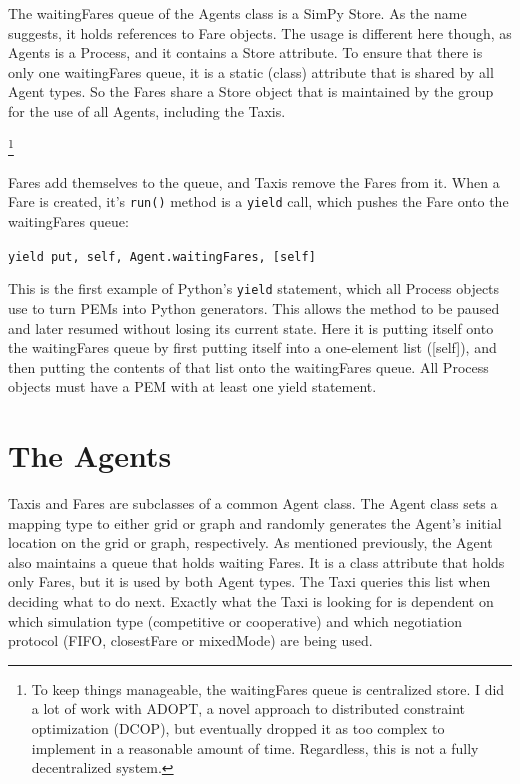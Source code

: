 \documentclass[11pt,letterpaper,onecolumn,twoside,openright,draft]{report}
\begin{document}
The waitingFares queue of the Agents class is a SimPy Store.
As the name suggests, it holds references to Fare objects.
The usage is different here though, as Agents is a Process, and it contains a Store attribute.
To ensure that there is only one waitingFares queue, it is a static (class) attribute that is shared by all Agent types.
So the Fares share a Store object that is maintained by the group for the use of all Agents, including the Taxis.

\footnote{To keep things manageable, the waitingFares queue is centralized store.
I did a lot of work with ADOPT, a novel approach to distributed constraint optimization (DCOP), but eventually dropped it as too complex to implement in a reasonable amount of time.
Regardless, this is not a fully decentralized system.}

Fares add themselves to the queue, and Taxis remove the Fares from it.
When a Fare is created, it's \texttt{run()} method is a \texttt{yield} call, which pushes the Fare onto the waitingFares queue:

\texttt{yield put, self, Agent.waitingFares, [self]}

This is the first example of Python's \texttt{yield} statement, which all Process objects use to turn PEMs into Python generators.
This allows the method to be paused and later resumed without losing its current state.
Here it is putting itself onto the waitingFares queue by first putting itself into a one-element list ([self]), and then putting the contents of that list onto the waitingFares queue.
All Process objects must have a PEM with at least one yield statement.

\section{The Agents}
Taxis and Fares are subclasses of a common Agent class.
The Agent class sets a mapping type to either grid or graph and randomly generates the Agent's initial location on the grid or graph, respectively.
As mentioned previously, the Agent also maintains a queue that holds waiting Fares.
It is a class attribute that holds only Fares, but it is used by both Agent types.
The Taxi queries this list when deciding what to do next.
Exactly what the Taxi is looking for is dependent on which simulation type (competitive or cooperative) and which negotiation protocol (FIFO, closestFare or mixedMode) are being used.
\end{document}
